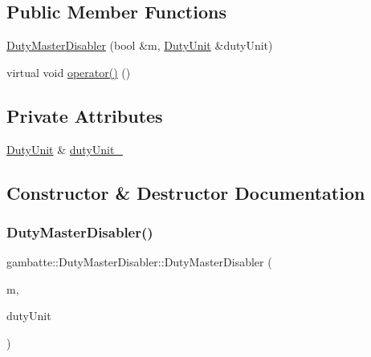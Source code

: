\subsection*{Public Member Functions}
\begin{DoxyCompactItemize}
\item 
\hyperlink{classgambatte_1_1DutyMasterDisabler_ab529f2ecc1ead79810197e3d786894e2}{Duty\+Master\+Disabler} (bool \&m, \hyperlink{classgambatte_1_1DutyUnit}{Duty\+Unit} \&duty\+Unit)
\item 
virtual void \hyperlink{classgambatte_1_1DutyMasterDisabler_a21f513f0b20eae19255a473668a099f6}{operator()} ()
\end{DoxyCompactItemize}
\subsection*{Private Attributes}
\begin{DoxyCompactItemize}
\item 
\hyperlink{classgambatte_1_1DutyUnit}{Duty\+Unit} \& \hyperlink{classgambatte_1_1DutyMasterDisabler_a972464d15d13fd132dd1a9266f39bc13}{duty\+Unit\+\_\+}
\end{DoxyCompactItemize}


\subsection{Constructor \& Destructor Documentation}
\mbox{\label{classgambatte_1_1DutyMasterDisabler_ab529f2ecc1ead79810197e3d786894e2}} 
\subsubsection{\texorpdfstring{Duty\+Master\+Disabler()}{DutyMasterDisabler()}}
{\footnotesize\ttfamily gambatte\+::\+Duty\+Master\+Disabler\+::\+Duty\+Master\+Disabler (\begin{DoxyParamCaption}\item[{bool \&}]{m,  }\item[{\hyperlink{classgambatte_1_1DutyUnit}{Duty\+Unit} \&}]{duty\+Unit }\end{DoxyParamCaption})\hspace{0.3cm}{\ttfamily [inline]}}



